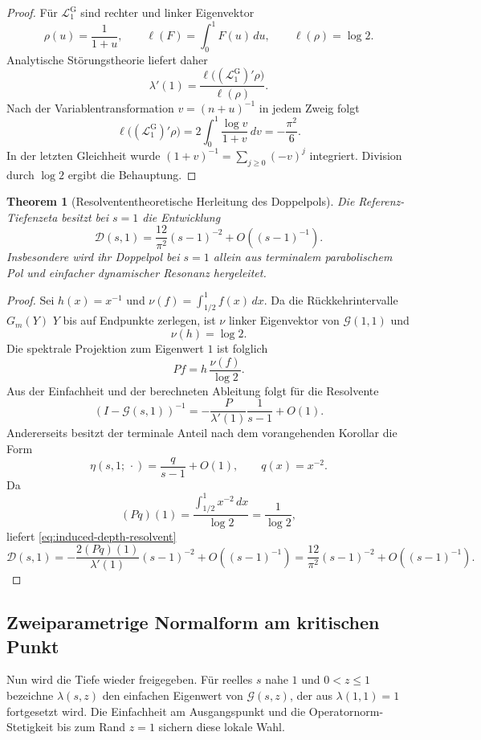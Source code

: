 \documentclass[11pt,a4paper]{article}
\newtheorem{theorem}[remark]{Theorem}
\begin{document}
\begin{proof}
Für $\mathcal L_1^{\mathrm G}$ sind rechter und linker Eigenvektor
\[
 \rho(u)=\frac1{1+u},
 \qquad
 \ell(F)=\int_0^1F(u)\,du,
 \qquad
 \ell(\rho)=\log2.
\]
Analytische Störungstheorie liefert daher
\[
 \lambda'(1)
 =
 \frac{\ell\bigl((\mathcal L_1^{\mathrm G})'\rho\bigr)}
      {\ell(\rho)}.
\]
Nach der Variablentransformation $v=(n+u)^{-1}$ in jedem Zweig folgt
\[
 \ell\bigl((\mathcal L_1^{\mathrm G})'\rho\bigr)
 =
 2\int_0^1\frac{\log v}{1+v}\,dv
 =
 -\frac{\pi^2}{6}.
\]
In der letzten Gleichheit wurde
$(1+v)^{-1}=\sum_{j\ge0}(-v)^j$ integriert. Division durch $\log2$
ergibt die Behauptung.
\end{proof}

\begin{theorem}[Resolvententheoretische Herleitung des Doppelpols]
Die Referenz-Tiefenzeta besitzt bei $s=1$ die Entwicklung
\[
 \mathscr D(s,1)
 =
 \frac{12}{\pi^2}(s-1)^{-2}
 +O\!\left((s-1)^{-1}\right).
\]
Insbesondere wird ihr Doppelpol bei $s=1$ allein aus terminalem
parabolischem Pol und einfacher dynamischer Resonanz hergeleitet.
\end{theorem}

\begin{proof}
Sei $h(x)=x^{-1}$ und $\nu(f)=\int_{1/2}^1f(x)\,dx$. Da die
Rückkehrintervalle $G_m(Y)$ $Y$ bis auf Endpunkte zerlegen, ist
$\nu$ linker Eigenvektor von $\mathcal G(1,1)$ und
\[
 \nu(h)=\log2.
\]
Die spektrale Projektion zum Eigenwert $1$ ist folglich
\[
 Pf=h\,\frac{\nu(f)}{\log2}.
\]
Aus der Einfachheit und der berechneten Ableitung folgt für die
Resolvente
\[
 (I-\mathcal G(s,1))^{-1}
 =
 -\frac{P}{\lambda'(1)}\frac1{s-1}+O(1).
\]
Andererseits besitzt der terminale Anteil nach dem vorangehenden
Korollar die Form
\[
 \eta(s,1;\,\cdot)
 =
 \frac{q}{s-1}+O(1),
 \qquad q(x)=x^{-2}.
\]
Da
\[
 (Pq)(1)
 =
 \frac{\int_{1/2}^1x^{-2}\,dx}{\log2}
 =
 \frac1{\log2},
\]
liefert \eqref{eq:induced-depth-resolvent}
\[
 \mathscr D(s,1)
 =
 -\frac{2(Pq)(1)}{\lambda'(1)}(s-1)^{-2}
 +O\!\left((s-1)^{-1}\right)
 =
 \frac{12}{\pi^2}(s-1)^{-2}
 +O\!\left((s-1)^{-1}\right).
\]
\end{proof}


\subsection{Zweiparametrige Normalform am kritischen Punkt}

Nun wird die Tiefe wieder freigegeben. Für reelles $s$ nahe $1$ und
$0<z\le1$ bezeichne $\lambda(s,z)$ den einfachen Eigenwert von
$\mathcal G(s,z)$, der aus $\lambda(1,1)=1$ fortgesetzt wird. Die
Einfachheit am Ausgangspunkt und die Operatornorm-Stetigkeit bis zum
Rand $z=1$ sichern diese lokale Wahl.
\end{document}

